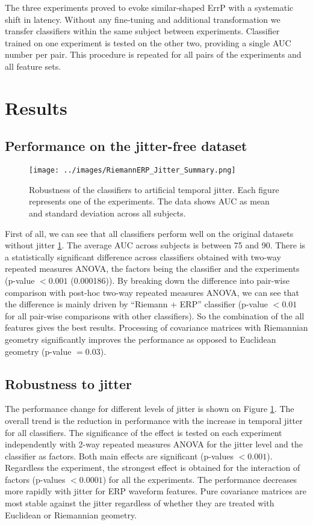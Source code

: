 \documentclass[12pt]{iopart}
\begin{document}
The three experiments proved to evoke similar-shaped ErrP with a 
systematic shift in latency. Without any fine-tuning and additional
transformation we transfer classifiers within the same subject
between experiments. Classifier trained on one experiment
is tested on the other two, providing a single AUC number per pair.
This procedure is repeated for all pairs of the experiments and all feature sets.


\section{Results}
\label{sec:results}

\subsection{Performance on the jitter-free dataset}

\begin{figure}[!t]
    \texttt{[image: ../images/RiemannERP\_Jitter\_Summary.png]}
\caption{Robustness of the classifiers to artificial temporal jitter.
    Each figure represents one of the experiments. The data shows
    AUC as mean and standard deviation across all subjects.}
\label{fig:jitter}
\end{figure}

First of all, we can see that all classifiers perform well on the
original datasets without jitter \ref{fig:jitter}. The average AUC across subjects is between 75 and 90.
There is a statistically significant difference across classifiers obtained with two-way repeated
measures ANOVA, the factors being the classifier and the experiments (p-value $< 0.001$
(0.000186)). By breaking down the difference into pair-wise comparison with post-hoc
two-way repeated measures ANOVA, we can see that the difference is mainly driven by
``Riemann + ERP'' classifier (p-value $< 0.01$ for all pair-wise comparisons with other
classifiers). So the combination of the all features gives the best results. Processing of
covariance matrices with Riemannian geometry significantly improves the performance
as opposed to Euclidean geometry (p-value $= 0.03$).


\subsection{Robustness to jitter}

The performance change for different levels of jitter is shown on Figure \ref{fig:jitter}.
The overall trend is the reduction in performance with the increase in temporal jitter for all classifiers.
The significance of the effect is tested on each experiment independently
with 2-way repeated measures ANOVA for the jitter level and the classifier
as factors. Both main effects are significant (p-values $<0.001$). 
Regardless the experiment, the strongest effect is obtained for the interaction
of factors (p-values $< 0.0001$) for all the experiments. The performance decreases more
rapidly with jitter for ERP waveform features.
Pure covariance matrices are most stable against the jitter regardless of whether they are
treated with Euclidean or Riemannian geometry.
\end{document}
